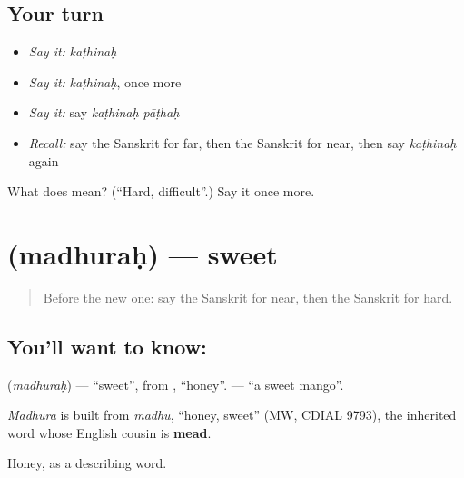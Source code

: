 \subsection*{Your turn}
\begin{itemize}
\raggedright
  \item \emph{Say it:} \emph{kaṭhinaḥ}
  \item \emph{Say it:} \emph{kaṭhinaḥ}, once more
  \item \emph{Say it:} say \emph{kaṭhinaḥ pāṭhaḥ}
  \item \emph{Recall:} say the Sanskrit for far, then the Sanskrit for near, then say \emph{kaṭhinaḥ} again
\end{itemize}

\begin{tcolorbox}[breakable,colback=teal!4,colframe=teal!35!black,title={Before you move on}]
What does  mean? (\textquotedblleft{}Hard, difficult\textquotedblright{}.) Say it once more.
\end{tcolorbox}
\section[\texorpdfstring{\sk{मधुरः} (madhuraḥ)}{मधुरः (madhuraḥ)}]{ (madhuraḥ) — sweet}

\label{lesson:SA-C89-sweet}



\begin{quote}
Before the new one: say the Sanskrit for near, then the Sanskrit for hard.
\end{quote}

\subsection*{You'll want to know: }
\textbf{} (\emph{madhuraḥ}) — \textquotedblleft{}sweet\textquotedblright{}, from \textbf{}, \textquotedblleft{}honey\textquotedblright{}. \textbf{ } — \textquotedblleft{}a sweet mango\textquotedblright{}.

\begin{cousinweb}
\emph{Madhura} is built from \emph{madhu}, \textquotedblleft{}honey, sweet\textquotedblright{} (MW, CDIAL 9793), the inherited word whose English cousin is \textbf{mead}.
\end{cousinweb}

\begin{grammarlens}[title={What you've built}]
Honey, as a describing word.
\end{grammarlens}

